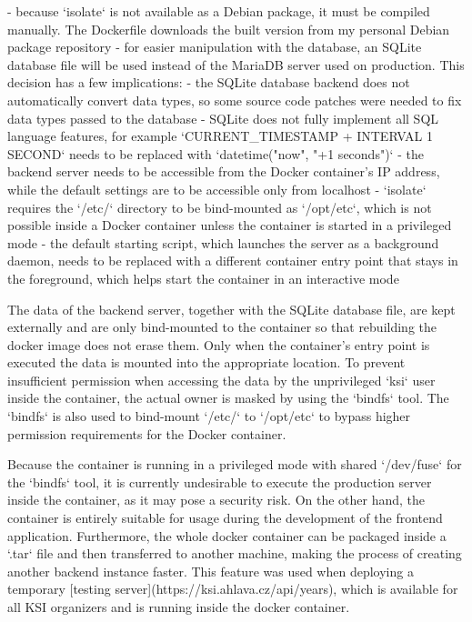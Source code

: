 \documentclass[
  digital, %
  oneside, %
  lof,     %
  nolot,     %
]{fithesis4}
\begin{document}
{- because `isolate` is not available as a Debian package, it must be compiled manually. The Dockerfile downloads the built version from my personal Debian package repository
- for easier manipulation with the database, an SQLite database file will be used instead of the MariaDB server used on production. This decision has a few implications:
    - the SQLite database backend does not automatically convert data types, so some source code patches were needed to fix data types passed to the database
    - SQLite does not fully implement all SQL language features, for example `CURRENT_TIMESTAMP + INTERVAL 1 SECOND` needs to be replaced with `datetime("now", "+1 seconds")`
- the backend server needs to be accessible from the Docker container's IP address, while the default settings are to be accessible only from localhost
- `isolate` requires the `/etc/` directory to be bind-mounted as `/opt/etc`, which is not possible inside a Docker container unless the container is started in a privileged mode
- the default starting script, which launches the server as a background daemon, needs to be replaced with a different container entry point that stays in the foreground, which helps start the container in an interactive mode

The data of the backend server, together with the SQLite database file, are kept externally and are only bind-mounted to the container so that rebuilding the docker image does not erase them. Only when the container's entry point is executed the data is mounted into the appropriate location. To prevent insufficient permission when accessing the data by the unprivileged `ksi` user inside the container, the actual owner is masked by using the `bindfs` tool. The `bindfs` is also used to bind-mount `/etc/` to `/opt/etc` to bypass higher permission requirements for the Docker container. 

Because the container is running in a privileged mode with shared `/dev/fuse` for the `bindfs` tool, it is currently undesirable to execute the production server inside the container, as it may pose a security risk. On the other hand, the container is entirely suitable for usage during the development of the frontend application. Furthermore, the whole docker container can be packaged inside a `.tar` file and then transferred to another machine, making the process of creating another backend instance faster. This feature was used when deploying a temporary [testing server](https://ksi.ahlava.cz/api/years), which is available for all KSI organizers and is running inside the docker container.

}
\end{document}
